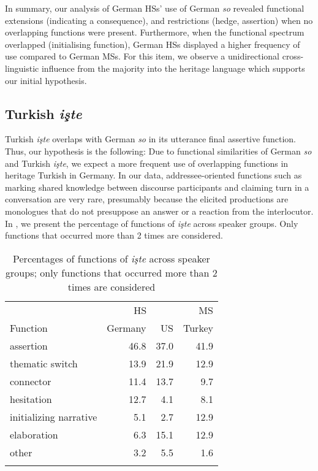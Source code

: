 \documentclass[output=paper,colorlinks,citecolor=brown]{langscibook}
\begin{document}
\noindent In summary, our analysis of German HSs’ use of German \textit{so} revealed functional extensions (indicating a consequence), and restrictions (hedge, assertion) when no overlapping functions were present. Furthermore, when the functional spectrum overlapped (initialising function), German HSs displayed a higher frequency of use compared to German MSs. For this item, we observe a unidirectional cross-linguistic influence from the majority into the heritage language which supports our initial hypothesis.

\subsection{Turkish \emph{işte}}
\label{sec:sub:labrenzetal:Turkish_iste}
Turkish \textit{işte} overlaps with German \textit{so}  in its utterance final assertive function. Thus, our hypothesis is the following:
Due to functional similarities of German \textit{so}  and Turkish \textit{işte}, we expect a more frequent use of overlapping functions in heritage Turkish in Germany.
In our data, addressee-oriented functions such as marking shared knowledge between discourse participants and claiming turn in a conversation are very rare, presumably because the elicited productions are monologues that do not presuppose an answer or a reaction from the interlocutor. In , we present the percentage of functions of \textit{işte} across speaker groups. Only functions that occurred more than 2 times are considered.

\begin{table}
\caption{Percentages of functions of \textit{işte} across speaker groups; only functions that occurred more than 2 times are considered}
\label{tab:labrenzetal:5}
\centering
\begin{tabular}{ lrrr }
  \lsptoprule
  & \multicolumn{2}{c}{HS} & MS \\
  \cmidrule(lr){2-3} \cmidrule(lr){4-4}
  Function & Germany & US & Turkey \\
  \midrule
  assertion & 46.8 & 37.0 & 41.9 \\
  thematic switch & 13.9 & 21.9 & 12.9 \\
  connector & 11.4 & 13.7 & 9.7 \\
  hesitation & 12.7 & 4.1 & 8.1 \\
  initializing narrative & 5.1 & 2.7 & 12.9 \\
  elaboration & 6.3 & 15.1 & 12.9 \\
  other & 3.2 & 5.5 & 1.6 \\
  \lspbottomrule
\end{tabular}
\end{table}
\end{document}
